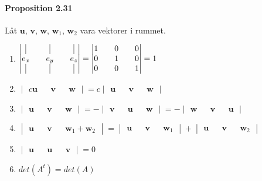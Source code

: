 \paragraph{Proposition 2.31} Låt $\bm{u}$, $\bm{v}$, $\bm{w}$, $\bm{w}_{1}$, $\bm{w}_{2}$ vara vektorer i rummet.
\begin{enumerate}
    \item 
        $\begin{vmatrix}
            \vline&&\vline&&\vline\\
            e_{x}&&e_{y}&&e_{z}\\
            \vline&&\vline&&\vline
        \end{vmatrix} = 
        \begin{vmatrix}
            1&&0&&0\\
            0&&1&&0\\
            0&&0&&1
        \end{vmatrix}=1$

    \item 
        $\begin{vmatrix}
            c\bm{u}&&\bm{v}&&\bm{w}
        \end{vmatrix}=c\begin{vmatrix}
            \bm{u}&&\bm{v}&&\bm{w}
        \end{vmatrix}$

    \item 
        $\begin{vmatrix}
            \bm{u}&&\bm{v}&&\bm{w}
        \end{vmatrix}=
        -\begin{vmatrix}
            \bm{v}&&\bm{u}&&\bm{w}
        \end{vmatrix}=
        -\begin{vmatrix}
            \bm{w}&&\bm{v}&&\bm{u}
        \end{vmatrix}$

    \item 
        $\begin{vmatrix}
            \bm{u}&&\bm{v}&&\bm{w}_{1}+\bm{w}_{2}
        \end{vmatrix}=
        \begin{vmatrix}
            \bm{u}&&\bm{v}&&\bm{w}_{1}
        \end{vmatrix}+
        \begin{vmatrix}
            \bm{u}&&\bm{v}&&\bm{w}_{2}
        \end{vmatrix}$

    \item 
        $\begin{vmatrix}
            \bm{u}&&\bm{u}&&\bm{v}
        \end{vmatrix}=0$
    \item $det(A^{t})=det(A)$
\end{enumerate}


